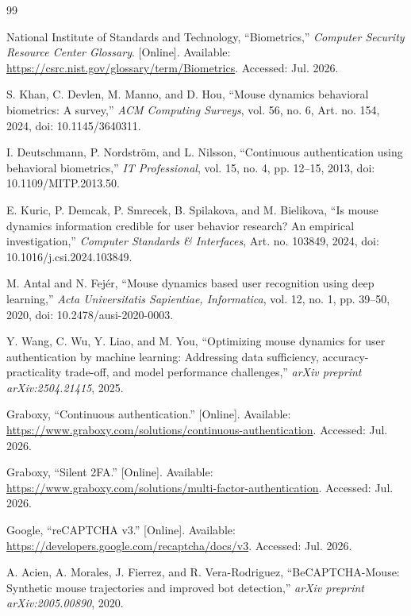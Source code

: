 \documentclass[conference]{IEEEtran}
\begin{document}
\begin{thebibliography}{99}

National Institute of Standards and Technology,
``Biometrics,''
\emph{Computer Security Resource Center Glossary}.
[Online]. Available: \url{https://csrc.nist.gov/glossary/term/Biometrics}.
Accessed: Jul. 2026.

S. Khan, C. Devlen, M. Manno, and D. Hou,
``Mouse dynamics behavioral biometrics: A survey,''
\emph{ACM Computing Surveys},
vol. 56, no. 6, Art. no. 154, 2024,
doi: 10.1145/3640311.

I. Deutschmann, P. Nordstr{\"o}m, and L. Nilsson,
``Continuous authentication using behavioral biometrics,''
\emph{IT Professional},
vol. 15, no. 4, pp. 12--15, 2013,
doi: 10.1109/MITP.2013.50.

E. Kuric, P. Demcak, P. Smrecek, B. Spilakova, and M. Bielikova,
``Is mouse dynamics information credible for user behavior research? An empirical investigation,''
\emph{Computer Standards \& Interfaces},
Art. no. 103849, 2024,
doi: 10.1016/j.csi.2024.103849.

M. Antal and N. Fej{\'e}r,
``Mouse dynamics based user recognition using deep learning,''
\emph{Acta Universitatis Sapientiae, Informatica},
vol. 12, no. 1, pp. 39--50, 2020,
doi: 10.2478/ausi-2020-0003.

Y. Wang, C. Wu, Y. Liao, and M. You,
``Optimizing mouse dynamics for user authentication by machine learning:
Addressing data sufficiency, accuracy-practicality trade-off, and model
performance challenges,''
\emph{arXiv preprint arXiv:2504.21415}, 2025.

Graboxy,
``Continuous authentication.''
[Online]. Available:
\url{https://www.graboxy.com/solutions/continuous-authentication}.
Accessed: Jul. 2026.

Graboxy,
``Silent 2FA.''
[Online]. Available:
\url{https://www.graboxy.com/solutions/multi-factor-authentication}.
Accessed: Jul. 2026.

Google,
``reCAPTCHA v3.''
[Online]. Available:
\url{https://developers.google.com/recaptcha/docs/v3}.
Accessed: Jul. 2026.

A. Acien, A. Morales, J. Fierrez, and R. Vera-Rodriguez,
``BeCAPTCHA-Mouse: Synthetic mouse trajectories and improved bot detection,''
\emph{arXiv preprint arXiv:2005.00890}, 2020.


\end{thebibliography}
\end{document}
